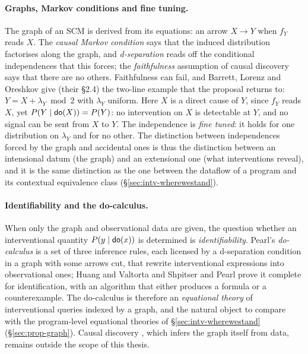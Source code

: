 \paragraph{Graphs, Markov conditions and fine tuning.} The graph of an SCM is derived from its equations: an arrow $X\to Y$ when $f_Y$ reads $X$. The \emph{causal Markov condition} says that the induced distribution factorises along the graph, and \emph{d-separation} \cite{pearl2009causality,spirtes2000causation} reads off the conditional independences that this forces; the \emph{faithfulness} assumption of causal discovery says that there are no others. Faithfulness can fail, and Barrett, Lorenz and Oreshkov \cite{barrett2019quantumcausalmodels} give (their \S2.4) the two-line example that the proposal returns to: $Y = X + \lambda_Y \bmod 2$ with $\lambda_Y$ uniform. Here $X$ is a direct cause of $Y$, since $f_Y$ reads $X$, yet $P(Y\mid \mathsf{do}(X)) = P(Y)$: no intervention on $X$ is detectable at $Y$, and no signal can be sent from $X$ to $Y$. The independence is \emph{fine tuned}: it holds for one distribution on $\lambda_Y$ and for no other. The distinction between independences forced by the graph and accidental ones is thus the distinction between an intensional datum (the graph) and an extensional one (what interventions reveal), and it is the same distinction as the one between the dataflow of a program and its contextual equivalence class (\S\ref{sec:intv-wherewestand}).

\paragraph{Identifiability and the do-calculus.} When only the graph and observational data are given, the question whether an interventional quantity $P(y\mid\mathsf{do}(x))$ is determined is \emph{identifiability}. Pearl's \emph{do-calculus} \cite{pearl1995docalculus} is a set of three inference rules, each licensed by a d-separation condition in a graph with some arrows cut, that rewrite interventional expressions into observational ones; Huang and Valtorta \cite{huang2006complete} and Shpitser and Pearl \cite{shpitser2006identification,JMLR:v9:shpitser08a} prove it complete for identification, with an algorithm that either produces a formula or a counterexample. The do-calculus is therefore an \emph{equational theory} of interventional queries indexed by a graph, and the natural object to compare with the program-level equational theories of \S\ref{sec:intv-wherewestand} (\S\ref{sec:prop-graph}). Causal discovery \cite{spirtes2000causation,peters_janzing_schoelkopf_2017_book}, which infers the graph itself from data, remains outside the scope of this thesis.


